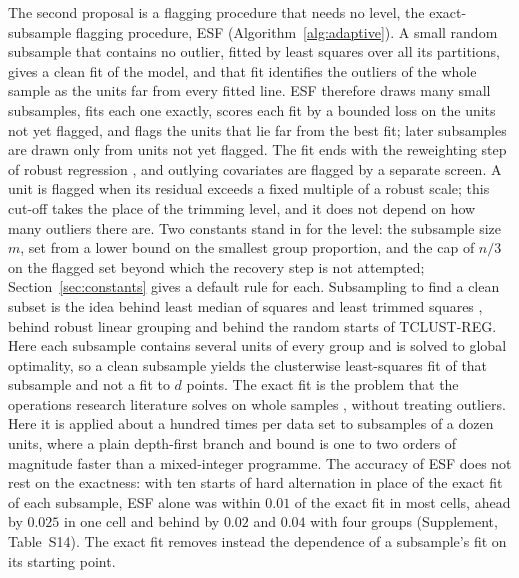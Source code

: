 The second proposal is a flagging procedure that needs no level, the exact-subsample flagging
procedure, ESF (Algorithm~\ref{alg:adaptive}). A small random subsample that contains no
outlier, fitted by least squares over all its partitions, gives a clean fit of the model, and
that fit identifies the outliers of the whole sample as the units far from every fitted line.
ESF therefore draws many small subsamples, fits each one exactly, scores each fit by a bounded
loss on the units not yet flagged, and flags the units that lie far from the best fit; later
subsamples are drawn only from units not yet flagged. The fit ends with the reweighting step of
robust regression \citep{rousseeuw1987robust}, and outlying covariates are flagged by a
separate screen. A unit is flagged when its residual exceeds a fixed multiple of a robust
scale; this cut-off takes the place of the trimming level, and it does not depend on how many
outliers there are. Two constants stand in for the level: the subsample size $m$, set from a
lower bound on the smallest group proportion, and the cap of $n/3$ on the flagged set beyond
which the recovery step is not attempted; Section~\ref{sec:constants} gives a default rule for
each. Subsampling to find a clean subset is the idea behind least median of squares and least
trimmed squares \citep{rousseeuw1984least,rousseeuw2006computing}, behind robust linear
grouping \citep{garciaescudero2009robust} and behind the random starts of TCLUST-REG. Here
each subsample contains several units of every group and is solved to global optimality, so
a clean subsample yields the clusterwise least-squares fit of that subsample and not a fit to
$d$ points. The exact fit is the problem that the operations research literature solves on
whole samples \citep{bertsimas2007classification,carbonneau2011globally,carbonneau2012extensions,carbonneau2014globally,fois2026clusterwise,bagirov2013nonsmooth,joki2020clusterwise,park2017algorithms},
without treating outliers. Here it is applied about a hundred times per data set to subsamples
of a dozen units, where a plain depth-first branch and bound is one to two orders of magnitude
faster than a mixed-integer programme. The accuracy of ESF does not rest on the exactness:
with ten starts of hard alternation in place of the exact fit of each subsample, ESF alone was
within $0.01$ of the exact fit in most cells, ahead by $0.025$ in one cell and behind by
$0.02$ and $0.04$ with four groups (Supplement, Table~S14). The exact fit removes instead the
dependence of a subsample's fit on its starting point.

